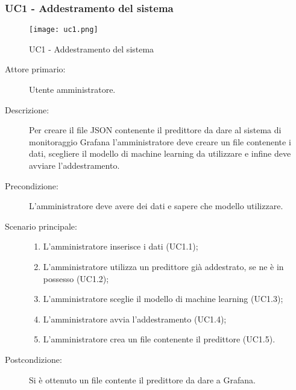 \subsubsection{UC1 - Addestramento del sistema}%
\label{sssec:uc1}

\begin{figure}[h!]
  \begin{center}
    \texttt{[image: uc1.png]}\\
    \caption{UC1 - Addestramento del sistema}%
    \label{fig:uc1}
  \end{center}
  \end{figure}

\begin{description}
  \item[Attore primario:] Utente amministratore.
  \item[Descrizione:] Per creare il file JSON contenente il predittore da dare al sistema di monitoraggio Grafana l'amministratore deve creare un file contenente i dati, scegliere il modello di machine learning da utilizzare e infine deve avviare l'addestramento.
  \item[Precondizione:] L'amministratore deve avere dei dati e sapere che modello utilizzare.
  \item[Scenario principale:]
  \begin{enumerate}
    \item L'amministratore inserisce i dati (UC1.1);
    \item L'amministratore utilizza un predittore già addestrato, se ne è in possesso (UC1.2);
    \item L'amministratore sceglie il modello di machine learning (UC1.3);
    \item L'amministratore avvia l'addestramento (UC1.4);
    \item L'amministratore crea un file contenente il predittore (UC1.5).
  \end{enumerate}
  \item[Postcondizione:] Si è ottenuto un file contente il predittore da dare a Grafana.
\end{description}

